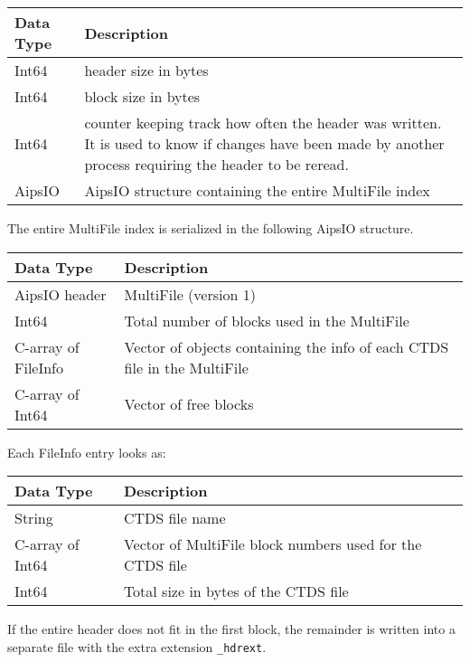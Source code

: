 \begin{itemize}
\begin{itemize}
\vspace{0.15in}
\begin{tabular}{|l|p{13cm}|} \hline
  Data Type & Description \\ \hline\hline
  Int64 & header size in bytes \\
  Int64 & block size in bytes \\
  Int64 & counter keeping track how often the header was written. It
          is used to know if changes have been made by another process
          requiring the header to be reread. \\
  AipsIO & AipsIO structure containing the entire MultiFile index \\
  \hline
\end{tabular}
\vspace{0.15in}

The entire MultiFile index is serialized in the following AipsIO structure.

\vspace{0.15in}
\begin{tabular}{|l|p{13cm}|} \hline
  Data Type & Description \\ \hline\hline
  AipsIO header & MultiFile (version 1) \\
  Int64 & Total number of blocks used in the MultiFile \\
  C-array of FileInfo &  Vector of objects containing the info of each
                        CTDS file in the MultiFile \\
  C-array of Int64 & Vector of free blocks \\
  \hline
\end{tabular}
\vspace{0.15in}

Each FileInfo entry looks as:

\vspace{0.15in}
\begin{tabular}{|l|p{13cm}|} \hline
  Data Type & Description \\ \hline\hline
  String & CTDS file name \\
  C-array of Int64 & Vector of MultiFile block numbers used for the CTDS file \\
  Int64 & Total size in bytes of the CTDS file \\
  \hline
\end{tabular}
\vspace{0.15in}

If the entire header does not fit in the first block, the remainder is
written into a separate file with the extra extension \texttt{\_hdrext}.


\end{itemize}
\end{itemize}
